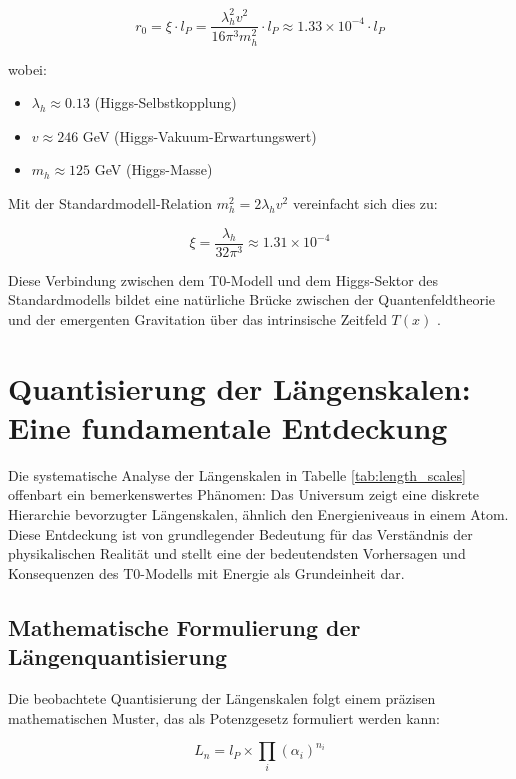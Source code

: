 \documentclass[12pt,a4paper]{article}
\newcommand{\Tfield}{T(x)}
\begin{document}
	\begin{equation}
		r_0 = \xi \cdot l_P = \frac{\lambda_h^2v^2}{16\pi^3m_h^2} \cdot l_P \approx 1.33 \times 10^{-4} \cdot l_P
	\end{equation}
	
	wobei:
	\begin{itemize}
		\item $\lambda_h \approx 0.13$ (Higgs-Selbstkopplung)
		\item $v \approx 246$ GeV (Higgs-Vakuum-Erwartungswert)
		\item $m_h \approx 125$ GeV (Higgs-Masse)
	\end{itemize}
	
	Mit der Standardmodell-Relation $m_h^2 = 2\lambda_h v^2$ vereinfacht sich dies zu:
	
	\begin{equation}
		\xi = \frac{\lambda_h}{32\pi^3} \approx 1.31 \times 10^{-4}
	\end{equation}
	
	Diese Verbindung zwischen dem T0-Modell und dem Higgs-Sektor des Standardmodells bildet eine natürliche Brücke zwischen der Quantenfeldtheorie und der emergenten Gravitation über das intrinsische Zeitfeld $\Tfield$ \cite{pascher_higgs_2025}.
	\section{Quantisierung der Längenskalen: Eine fundamentale Entdeckung}
	
	Die systematische Analyse der Längenskalen in Tabelle \ref{tab:length_scales} offenbart ein bemerkenswertes Phänomen: Das Universum zeigt eine diskrete Hierarchie bevorzugter Längenskalen, ähnlich den Energieniveaus in einem Atom. Diese Entdeckung ist von grundlegender Bedeutung für das Verständnis der physikalischen Realität und stellt eine der bedeutendsten Vorhersagen und Konsequenzen des T0-Modells mit Energie als Grundeinheit dar.
	
	\subsection{Mathematische Formulierung der Längenquantisierung}
	
	Die beobachtete Quantisierung der Längenskalen folgt einem präzisen mathematischen Muster, das als Potenzgesetz formuliert werden kann:
	
	\begin{equation}
		L_n = l_P \times \prod_{i} (\alpha_i)^{n_i}
	\end{equation}
	
\end{document}
